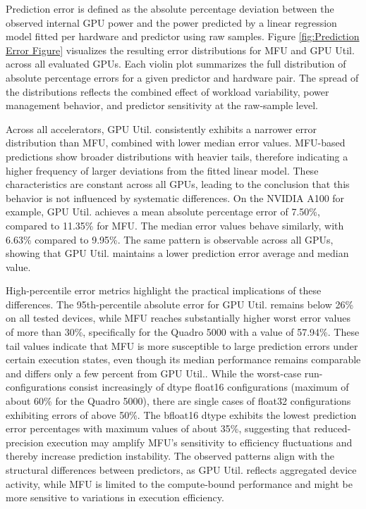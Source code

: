 \documentclass[runningheads]{llncs}
\begin{document}
Prediction error is defined as the absolute percentage deviation between the observed internal GPU power and the power predicted by a linear regression model fitted per hardware and predictor using raw samples. Figure \ref{fig:Prediction Error Figure} visualizes the resulting error distributions for MFU and GPU Util. across all evaluated GPUs. Each violin plot summarizes the full distribution of absolute percentage errors for a given predictor and hardware pair. The spread of the distributions reflects the combined effect of workload variability, power management behavior, and predictor sensitivity at the raw-sample level.

Across all accelerators, GPU Util. consistently exhibits a narrower error distribution than MFU, combined with lower median error values. MFU-based predictions show broader distributions with heavier tails, therefore indicating a higher frequency of larger deviations from the fitted linear model. These characteristics are constant across all GPUs, leading to the conclusion that this behavior is not influenced by systematic differences. On the NVIDIA A100 for example, GPU Util. achieves a mean absolute percentage error of 7.50\%, compared to 11.35\% for MFU. The median error values behave similarly, with 6.63\% compared to 9.95\%. The same pattern is observable across all GPUs, showing that GPU Util. maintains a lower prediction error average and median value.

High-percentile error metrics highlight the practical implications of these differences. The 95th-percentile absolute error for GPU Util. remains below 26\% on all tested devices, while MFU reaches substantially higher worst error values of more than 30\%, specifically for the Quadro 5000 with a value of 57.94\%. These tail values indicate that MFU is more susceptible to large prediction errors under certain execution states, even though its median performance remains comparable and differs only a few percent from GPU Util.. While the worst-case run-configurations consist increasingly of dtype float16 configurations (maximum of about 60\% for the Quadro 5000), there are single cases of float32 configurations exhibiting errors of above 50\%. The bfloat16 dtype exhibits the lowest prediction error percentages with maximum values of about 35\%, suggesting that reduced-precision execution may amplify MFU's sensitivity to efficiency fluctuations and thereby increase prediction instability.
The observed patterns align with the structural differences between predictors, as GPU Util. reflects aggregated device activity, while MFU is limited to the compute-bound performance and might be more sensitive to variations in execution efficiency.
\end{document}
